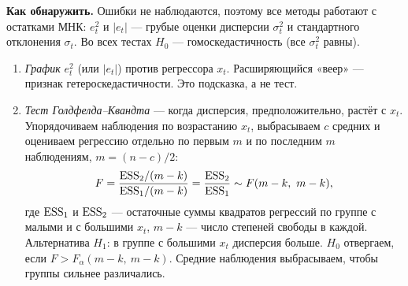 \textbf{Как обнаружить.} Ошибки не наблюдаются, поэтому все методы работают с
остатками МНК: $e_t^2$ и $|e_t|$ — грубые оценки дисперсии $\sigma_t^2$ и
стандартного отклонения $\sigma_t$. Во всех тестах $H_0$ —
гомоскедастичность (все $\sigma_t^2$ равны).
\begin{enumerate}[label=\arabic*), leftmargin=2.2em, itemsep=4pt]
  \item \emph{График} $e_t^2$ (или $|e_t|$) против регрессора $x_t$.
        Расширяющийся «веер» — признак гетероскедастичности. Это подсказка,
        а не тест.

  \item \emph{Тест Голдфелда--Квандта} — когда дисперсия, предположительно,
        растёт с $x_t$. Упорядочиваем наблюдения по возрастанию $x_t$,
        выбрасываем $c$ средних и оцениваем регрессию отдельно по первым $m$
        и по последним $m$ наблюдениям, $m = (n - c)/2$:
        \begin{equation}
          F = \frac{\mathrm{ESS}_2/(m-k)}{\mathrm{ESS}_1/(m-k)} = \frac{\mathrm{ESS}_2}{\mathrm{ESS}_1}
          \sim F(m-k,\ m-k),
          \label{eq:gq}
        \end{equation}
        где $\mathrm{ESS}_1$ и $\mathrm{ESS}_2$ — остаточные суммы квадратов регрессий по
        группе с малыми и с большими $x_t$, $m - k$ — число степеней свободы
        в каждой. Альтернатива $H_1$: в группе с большими $x_t$ дисперсия
        больше. $H_0$ отвергаем, если $F > F_\alpha(m-k,\ m-k)$. Средние
        наблюдения выбрасываем, чтобы группы сильнее различались.


\end{enumerate}
